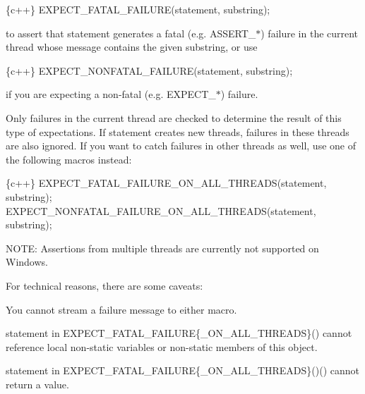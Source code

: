\begin{DoxyCode}
\{c++\}
  EXPECT\_FATAL\_FAILURE(statement, substring);
\end{DoxyCode}


to assert that {\ttfamily statement} generates a fatal (e.\+g. {\ttfamily A\+S\+S\+E\+R\+T\+\_\+$\ast$}) failure in the current thread whose message contains the given {\ttfamily substring}, or use


\begin{DoxyCode}
\{c++\}
  EXPECT\_NONFATAL\_FAILURE(statement, substring);
\end{DoxyCode}


if you are expecting a non-\/fatal (e.\+g. {\ttfamily E\+X\+P\+E\+C\+T\+\_\+$\ast$}) failure.

Only failures in the current thread are checked to determine the result of this type of expectations. If {\ttfamily statement} creates new threads, failures in these threads are also ignored. If you want to catch failures in other threads as well, use one of the following macros instead\+:


\begin{DoxyCode}
\{c++\}
  EXPECT\_FATAL\_FAILURE\_ON\_ALL\_THREADS(statement, substring);
  EXPECT\_NONFATAL\_FAILURE\_ON\_ALL\_THREADS(statement, substring);
\end{DoxyCode}


N\+O\+TE\+: Assertions from multiple threads are currently not supported on Windows.

For technical reasons, there are some caveats\+:


\begin{DoxyEnumerate}
\item You cannot stream a failure message to either macro.
\end{DoxyEnumerate}
\begin{DoxyEnumerate}
\item {\ttfamily statement} in {\ttfamily E\+X\+P\+E\+C\+T\+\_\+\+F\+A\+T\+A\+L\+\_\+\+F\+A\+I\+L\+U\+RE\{\+\_\+\+O\+N\+\_\+\+A\+L\+L\+\_\+\+T\+H\+R\+E\+A\+DS\}()} cannot reference local non-\/static variables or non-\/static members of {\ttfamily this} object.
\end{DoxyEnumerate}
\begin{DoxyEnumerate}
\item {\ttfamily statement} in {\ttfamily E\+X\+P\+E\+C\+T\+\_\+\+F\+A\+T\+A\+L\+\_\+\+F\+A\+I\+L\+U\+RE\{\+\_\+\+O\+N\+\_\+\+A\+L\+L\+\_\+\+T\+H\+R\+E\+A\+DS\}()()} cannot return a value.
\end{DoxyEnumerate}

